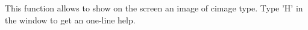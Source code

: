 This function allows to show on the screen an image of cimage type.
Type 'H' in the window to get an one-line help.
